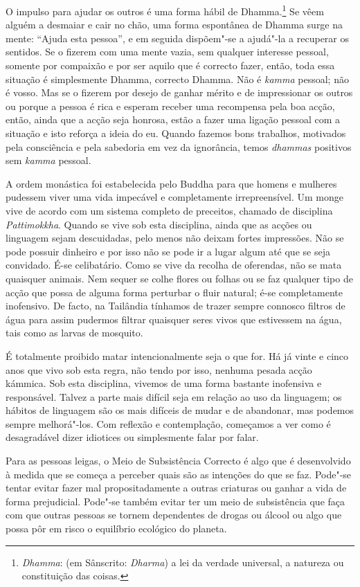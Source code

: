 O impulso para ajudar os outros é uma forma hábil de Dhamma.\footnote{%
  \emph{Dhamma}: (em Sânscrito: \emph{Dharma}) a lei da verdade universal, a
  natureza ou constituição das coisas.} Se vêem alguém a desmaiar e cair no chão,
uma forma espontânea de Dhamma surge na mente: “Ajuda esta pessoa”, e em seguida
dispõem"-se a ajudá"-la a recuperar os sentidos. Se o fizerem com uma mente vazia,
sem qualquer interesse pessoal, somente por compaixão e por ser aquilo que é
correcto fazer, então, toda essa situação é simplesmente Dhamma, correcto
Dhamma. Não é \emph{kamma} pessoal; não é vosso. Mas se o fizerem por desejo de
ganhar mérito e de impressionar os outros ou porque a pessoa é rica e esperam
receber uma recompensa pela boa acção, então, ainda que a acção seja honrosa,
estão a fazer uma ligação pessoal com a situação e isto reforça a ideia do eu.
Quando fazemos bons trabalhos, motivados pela consciência e pela sabedoria em
vez da ignorância, temos \emph{dhammas} positivos sem \emph{kamma} pessoal.

A ordem monástica foi estabelecida pelo Buddha para que homens e mulheres
pudessem viver uma vida impecável e completamente irrepreensível. Um monge vive
de acordo com um sistema completo de preceitos, chamado de disciplina
\emph{Pattimokkha}. Quando se vive sob esta disciplina, ainda que as acções ou
linguagem sejam descuidadas, pelo menos não deixam fortes impressões. Não se
pode possuir dinheiro e por isso não se pode ir a lugar algum até que se seja
convidado. É-se celibatário. Como se vive da recolha de oferendas, não se mata
quaisquer animais. Nem sequer se colhe flores ou folhas ou se faz qualquer tipo
de acção que possa de alguma forma perturbar o fluir natural; é-se completamente
inofensivo. De facto, na Tailândia tínhamos de trazer sempre connosco filtros de
água para assim pudermos filtrar quaisquer seres vivos que estivessem na água,
tais como as larvas de mosquito.

É totalmente proibido matar intencionalmente seja o que for. Há já vinte e cinco
anos que vivo sob esta regra, não tendo por isso, nenhuma pesada acção kámmica.
Sob esta disciplina, vivemos de uma forma bastante inofensiva e responsável.
Talvez a parte mais difícil seja em relação ao uso da linguagem; os hábitos de
linguagem são os mais difíceis de mudar e de abandonar, mas podemos sempre
melhorá"-los. Com reflexão e contemplação, começamos a ver como é desagradável
dizer idiotices ou simplesmente falar por falar.

Para as pessoas leigas, o Meio de Subsistência Correcto é algo que é desenvolvido à
medida que se começa a perceber quais são as intenções do que se faz. Pode"-se
tentar evitar fazer mal propositadamente a outras criaturas ou ganhar a vida de
forma prejudicial. Pode"-se também evitar ter um meio de subsistência que faça com 
que outras pessoas se tornem dependentes de drogas ou álcool ou algo que possa pôr
em risco o equilíbrio ecológico do planeta.

